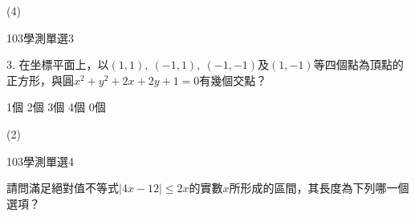 \begin{QUESTIONS}
\begin{QUESTION}
        \begin{QTAGS}\end{QTAGS}
        \begin{QANS}
            (4)
        \end{QANS}
        \begin{QSOLLIST}
        \end{QSOLLIST}
        \begin{QEMPTYSPACE}
        \end{QEMPTYSPACE}
    \end{QUESTION}
    \begin{QUESTION}
        \begin{ExamInfo}{103}{學測}{單選}{3}
        \end{ExamInfo}
        \begin{ExamAnsRateInfo}{73}{96}{86}{37}
        \end{ExamAnsRateInfo}
        \begin{QBODY}
			3.	在坐標平面上，以$(1,1),\ (-1,1),\ (-1,-1)$及$(1,-1)$等四個點為頂點的正方形，與圓${{x}^{2}}+{{y}^{2}}+2x+2y+1=0$有幾個交點？
			\begin{QOPS}
				\QOP 1個
				\QOP 2個
				\QOP 3個
				\QOP 4個
				\QOP 0個
			\end{QOPS}
        \end{QBODY}
        \begin{QFROMS}
        \end{QFROMS}
        \begin{QTAGS}\end{QTAGS}
        \begin{QANS}
            (2)
        \end{QANS}
        \begin{QSOLLIST}
        \end{QSOLLIST}
        \begin{QEMPTYSPACE}
        \end{QEMPTYSPACE}
    \end{QUESTION}
    \begin{QUESTION}
        \begin{ExamInfo}{103}{學測}{單選}{4}
        \end{ExamInfo}
        \begin{ExamAnsRateInfo}{68}{95}{79}{30}
        \end{ExamAnsRateInfo}
        \begin{QBODY}
			請問滿足絕對值不等式$\left| 4x-12 \right|\le 2x$的實數$x$所形成的區間，其長度為下列哪一個選項？

\end{QBODY}
\end{QUESTION}
\end{QUESTIONS}
